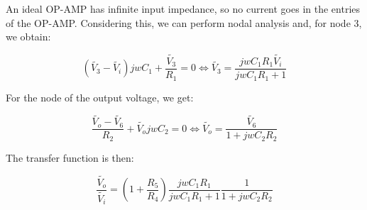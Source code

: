An ideal OP-AMP has infinite input impedance, so no current goes in the entries of the OP-AMP. Considering this, we can perform nodal analysis and, for node 3, we obtain: 

\begin{equation}
        (\widetilde{V_3}-\widetilde{V_i})jwC_1 + \frac{\widetilde{V_3}}{R_1} = 0 \iff \widetilde{V_3} = \frac{jwC_1R_1\widetilde{V_i}}{jwC_1R_1+1}
\end{equation}

For the node of the output voltage, we get:

\begin{equation}
        \frac{\widetilde{V_o}-\widetilde{V_6}}{R_2} + \widetilde{V_o}jwC_2 = 0 \iff \widetilde{V_o} = \frac{\widetilde{V_6}}{1+jwC_2R_2}
\end{equation}

The transfer function is then:

\begin{equation}
        \frac{\widetilde{V_o}}{\widetilde{V_i}} = (1+\frac{R_5}{R_4})\frac{jwC_1R_1}{jwC_1R_1+1}\frac{1}{1+jwC_2R_2}
\end{equation}




